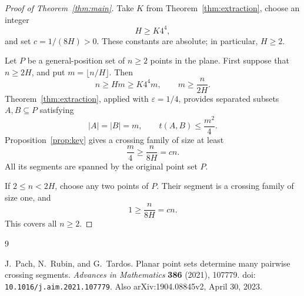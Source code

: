 \documentclass[12pt]{article}
\begin{document}
\begin{proof}[Proof of Theorem~\ref{thm:main}]
Take \(K\) from Theorem~\ref{thm:extraction}, choose an integer
\[
 H\geq K4^4,
\]
and set \(c=1/(8H)>0\). These constants are absolute; in particular,
\(H\geq2\).

Let \(P\) be a general-position set of \(n\geq2\) points in the
plane. First suppose that \(n\geq2H\), and put
\(m=\lfloor n/H\rfloor\). Then
\[
 n\geq Hm\geq K4^4m,
 \qquad
 m\geq \frac{n}{2H}.
\]
Theorem~\ref{thm:extraction}, applied with \(\varepsilon=1/4\),
provides separated subsets \(A,B\subseteq P\) satisfying
\[
 |A|=|B|=m,
 \qquad
 t(A,B)\leq \frac{m^2}{4}.
\]
Proposition~\ref{prop:key} gives a crossing family of size at least
\[
 \frac m4\geq \frac{n}{8H}=cn.
\]
All its segments are spanned by the original point set \(P\).

If \(2\leq n<2H\), choose any two points of \(P\). Their segment
is a crossing family of size one, and
\[
 1\geq \frac{n}{8H}=cn.
\]
This covers all \(n\geq2\).
\end{proof}

\begin{thebibliography}{9}

J.~Pach, N.~Rubin, and G.~Tardos.
\newblock Planar point sets determine many pairwise crossing segments.
\newblock \emph{Advances in Mathematics} \textbf{386} (2021), 107779.
\newblock doi: \nolinkurl{10.1016/j.aim.2021.107779}.
\newblock Also arXiv:1904.08845v2, April 30, 2023.

\end{thebibliography}
\end{document}
